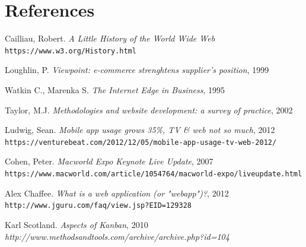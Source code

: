 \documentclass{article}
\begin{document}
        \section{References}
        \begin{thebibliography}{9}
            Cailliau, Robert. \textit{A Little History of the World Wide Web}
            \\\texttt{https://www.w3.org/History.html}

            Loughlin, P. \textit{Viewpoint: e-commerce strenghtens supplier's position}, 1999

            Watkin C., Marenka S. \textit{The Internet Edge in Business}, 1995 

            Taylor, M.J. \textit{Methodologies and website development: a survey of practice}, 2002

            Ludwig, Sean. \textit{Mobile app usage grows 35\%, TV \& web not so much}, 2012
            \\\texttt{https://venturebeat.com/2012/12/05/mobile-app-usage-tv-web-2012/}

            Cohen, Peter. \textit{Macworld Expo Keynote Live Update}, 2007
            \\\texttt{https://www.macworld.com/article/1054764/macworld-expo/liveupdate.html}

            Alex Chaffee. \textit{What is a web application (or "webapp")?}, 2012
            \\\texttt{http://www.jguru.com/faq/view.jsp?EID=129328}

            Karl Scotland. \textit{Aspects of Kanban}, 2010
            \\\textit{http://www.methodsandtools.com/archive/archive.php?id=104}

        \end{thebibliography}
    
\end{document}
